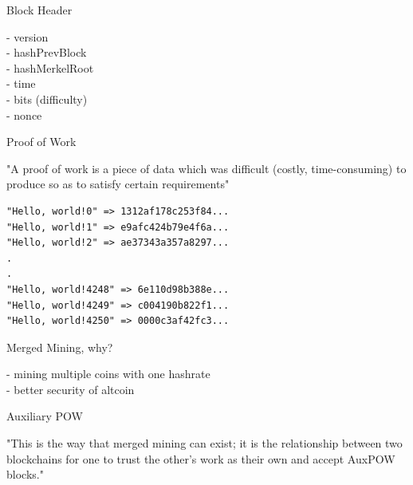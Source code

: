 \documentclass{beamer}
\begin{document}
\begin{frame}

    {\LARGE Block Header}\\

    \vspace{5mm}

    - version\\
    - hashPrevBlock\\
    - hashMerkelRoot\\
    - time\\
    - bits (difficulty)\\
    - nonce\\

\end{frame}

\begin{frame}[fragile]

    {\LARGE Proof of Work}\\

    \vspace{5mm}

    "A proof of work is a piece of data which was difficult (costly, time-consuming) to produce so as to satisfy certain requirements"\\

    \vspace{5mm}

    \begin{verbatim}
"Hello, world!0" => 1312af178c253f84...
"Hello, world!1" => e9afc424b79e4f6a...
"Hello, world!2" => ae37343a357a8297...
.
.
"Hello, world!4248" => 6e110d98b388e...
"Hello, world!4249" => c004190b822f1...
"Hello, world!4250" => 0000c3af42fc3...
    \end{verbatim}

\end{frame}

\begin{frame}

    {\LARGE Merged Mining, why?}\\

    \vspace{5mm}

    - mining multiple coins with one hashrate\\
    - better security of altcoin\\

\end{frame}

\begin{frame}

    {\LARGE Auxiliary POW}\\

    \vspace{5mm}

    "This is the way that merged mining can exist; it is the relationship between two blockchains for one to trust the other's work as their own and accept AuxPOW blocks."\\

\end{frame}
\end{document}
